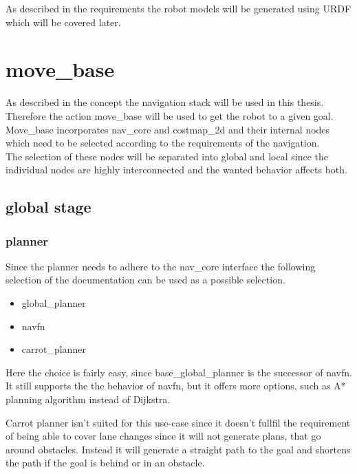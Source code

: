 As described in the requirements the robot models will be generated using URDF which will be covered later.

\section{move\_base}

As described in the concept the navigation stack will be used in this thesis. Therefore the action move\_base will be used to get the robot to a given goal.\\
 Move\_base incorporates nav\_core and costmap\_2d and their internal nodes which need to be selected according to the requirements of the navigation.\\ 
The selection of these nodes will be separated into global and local since the individual nodes are highly interconnected and the wanted behavior affects both.

\subsection{global stage}


\subsubsection{planner}

Since the planner needs to adhere to the nav\_core interface \cite{navcore} the following selection of the documentation can be used as a possible selection.

\begin{itemize}
	\item global\_planner
	\item navfn
	\item carrot\_planner
\end{itemize}


Here the choice is fairly easy, since base\_global\_planner is the successor of navfn. It still supports the the behavior of navfn, but it offers more options, such as A* planning algorithm instead of Dijkstra.


Carrot planner isn't suited for this use-case since it doesn't fullfil the requirement of being able to cover lane changes since it will not generate plans, that go around obstacles. Instead it will generate a straight path to the goal and shortens the path if the goal is behind or in an obstacle\cite{corrotplanner}.

